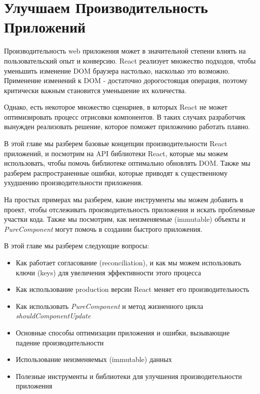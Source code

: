 \chapter{Улучшаем Производительность Приложений}

Производительность web приложения может в значительной степени влиять на пользовательский опыт и конверсию. React реализует множество подходов, чтобы уменьшить изменение DOM браузера настолько, насколько это возможно. Применение изменений к DOM - достаточно дорогостоящая операция, поэтому критически важным становится уменьшение их количества.

Однако, есть некоторое множество сценариев, в которых React не может оптимизировать процесс отрисовки компонентов. В таких случаях разработчик вынужден реализовать решение, которое поможет приложению работать плавно.

В этой главе мы разберем базовые концепции производительности React приложений, и посмотрим на API библиотеки React, которые мы можем использовать, чтобы помочь библиотеке оптимально обновлять DOM. Также мы разберем распространенные ошибки, которые приводят к существенному ухудшению производительности приложения.

На простых примерах мы разберем, какие инструменты мы можем добавить в проект, чтобы отслеживать производительность приложения и искать проблемные участки кода. Также мы посмотрим, как неизменяемые (immutable) объекты и \textit{PureComponent} могут помочь в создании быстрого приложения.

В этой главе мы разберем следующие вопросы:

\begin{itemize}
	\item Как работает согласование (reconciliation), и как мы можем использовать ключи (keys) для увеличения эффективности этого процесса
	\item Как использование production версии React меняет его производительность
	\item Как использовать \textit{PureComponent} и метод жизненного цикла \textit{shouldComponentUpdate}
	\item Основные способы оптимизации приложения и ошибки, вызывающие падение производительности
	\item Использование неизменяемых (immutable) данных
	\item Полезные инструменты и библиотеки для улучшения производительности приложения
\end{itemize}

